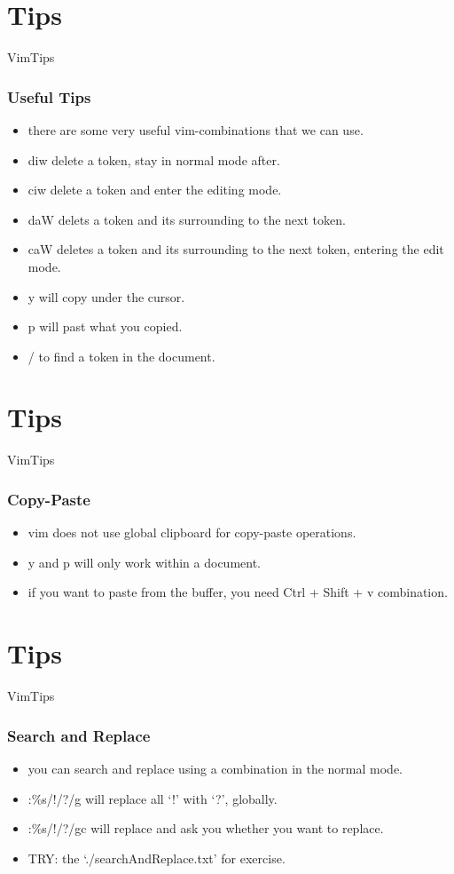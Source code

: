 \documentclass{beamer}
\begin{document}
\section{Tips}
\begin{frame}{VimTips}
    \frametitle{Useful Tips}
    \begin{itemize}
        \item there are some very useful vim-combinations that we can use.
        \item \textsf{diw} delete a token, stay in normal mode after.
        \item \textsf{ciw} delete a token and enter the editing mode.
        \item \textsf{daW} delets a token and its surrounding to the next token.
        \item \textsf{caW} deletes a token and its surrounding to the next token, entering the edit mode.
        \item \textsf{y} will copy under the cursor.
        \item \textsf{p} will past what you copied.
        \item \textsf{/} to find a token in the document.
    \end{itemize}
\end{frame}

\section{Tips}
\begin{frame}{VimTips}
    \frametitle{Copy-Paste}
    \begin{itemize}
        \item vim does not use global clipboard for copy-paste operations.
        \item \textsf{y} and \textsf{p} will only work within a document.
        \item if you want to paste from the buffer, you need \textsf{Ctrl} + \textsf{Shift} + \textsf{v} combination.
    \end{itemize}
\end{frame}

\section{Tips}
\begin{frame}{VimTips}
    \frametitle{Search and Replace}
    \begin{itemize}
        \item you can search and replace using a combination in the normal mode.
        \item \textsf{:\%s/!/?/g} will replace all `!' with `?', globally.
        \item \textsf{:\%s/!/?/gc} will replace and ask you whether you want to replace.
        \item TRY: the `./searchAndReplace.txt' for exercise.
    \end{itemize}
\end{frame}
\end{document}
